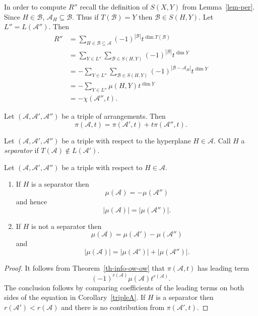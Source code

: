 \documentclass[mlq,fleqn]{w-art}
\newcommand{\thmref}[1]{Theorem~\ref{#1}}
\newcommand{\lemref}[1]{Lemma~\ref{#1}}
\newcommand{\A}{\mathcal{A}}
\newcommand{\B}{\mathcal{B}}
\newcommand{\envert}[1]{\left\lvert#1\right\rvert}
\let\abs=\envert
\begin{document}
In order to compute $R''$ recall the definition
of $S(X,Y)$ from \lemref{lem-per}. Since $H \in \B$,
$\A_{H} \subseteq \B$. Thus if $T(\B) = Y$ then
$\B \in S(H,Y)$. Let $L'' = L(\A'')$. Then
\begin{equation}\label{E_SXgYy}
\begin{split}
R''&= \sum_{H\in \B \subseteq \A} (-1)^{\abs{\B}}
t^{\dim T(\B)}\\
&= \sum_{Y \in L''} \sum_{\B \in S(H,Y)}
(-1)^{\abs{\B}}t^{\dim Y} \\
&= -\sum_{Y \in L''} \sum_{\B \in S(H,Y)} (-1)^
{\abs{\B - \A_{H}}} t^{\dim Y} \\
&= -\sum_{Y \in L''} \mu (H,Y)t^{\dim Y} \\
&= -\chi (\A '',t).
\end{split}
\end{equation}

\begin{cor}\label{tripleA}
Let $(\A,\A',\A'')$ be a triple of arrangements. Then
\[ \pi (\A,t) = \pi (\A',t) + t \pi (\A'',t). \]
\end{cor}

\begin{defn}
Let $(\A,\A',\A'')$ be a triple with respect to
the hyperplane $H \in \A$. Call $H$ a \textit{separator}
if $T(\A) \not\in L(\A')$.
\end{defn}

\begin{cor}\label{nsep}
Let $(\A,\A',\A'')$ be a triple with respect to $H \in \A$.
\begin{enumerate}
\renewcommand{\labelenumi}{(\roman{enumi})}
\item
If $H$ is a separator then
\[ \mu (\A) = - \mu (\A'') \]
and hence
\[ \abs{\mu (\A)} = \abs{ \mu (\A'')}. \]

\item If $H$ is not a separator then
\[\mu (\A) = \mu (\A') - \mu (\A'') \]
and
\[ \abs{\mu (\A)} = \abs{\mu (\A')} + \abs{\mu (\A'')}. \]
\end{enumerate}
\end{cor}

\begin{proof}
It follows from \thmref{th-info-ow-ow} that $\pi(\A,t)$
has leading term
\[(-1)^{r(\A)}\mu (\A)t^{r(\A)}.\]
The conclusion
follows by comparing coefficients of the leading
terms on both sides of the equation in
Corollary~\ref{tripleA}. If $H$ is a separator then
$r(\A') < r(\A)$ and there is no contribution
from $\pi (\A',t)$.
\end{proof}
\end{document}
